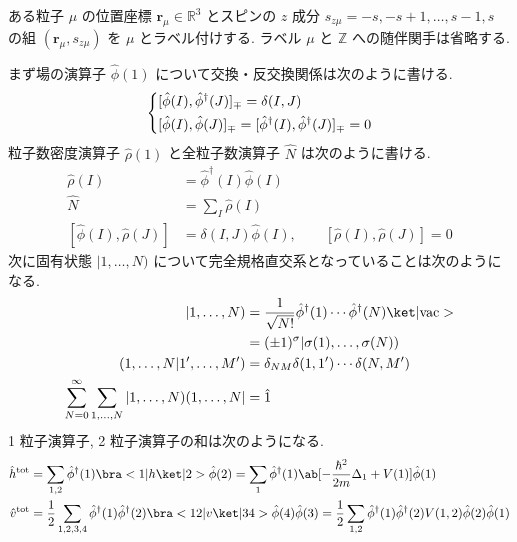 \documentclass[uplatex,dvipdfmx,a4paper,11pt]{jlreq}
\newcommand{\RR}{\mathbb{R}}
\newcommand{\ZZ}{\mathbb{Z}}
\newcommand{\rr}{\bm{r}}
\numberwithin{equation}{section}
\theoremstyle{definition}
\begin{document}
\begin{definition}[省略記法]
  ある粒子 $\mu$ の位置座標 $\rr_\mu\in\RR^3$ とスピンの $z$ 成分 $s_{z\mu} = -s,-s+1,\ldots,s-1,s$ の組 $(\rr_\mu, s_{z\mu})$ を $\mu$ とラベル付けする. ラベル $\mu$ と $\ZZ$ への随伴関手は省略する.
\end{definition}
\begin{example}[省略記法の例]
  まず場の演算子 $\hat{\phi}(1)$ について交換・反交換関係は次のように書ける.
  \begin{align}
    \begin{dcases}
      [\hat{\phi}(I), \hat{\phi}^\dagger(J)]_\mp = \delta(I, J) \\
      [\hat{\phi}(I), \hat{\phi}(J)]_\mp = [\hat{\phi}^\dagger(I), \hat{\phi}^\dagger(J)]_\mp = 0
    \end{dcases}
  \end{align}
  粒子数密度演算子 $\hat{\rho}(1)$ と全粒子数演算子 $\hat{N}$ は次のように書ける.
  \begin{align}
    \hat{\rho}(I)                  & = \hat{\phi}^\dagger(I)\hat{\phi}(I)                                   \\
    \hat{N}                        & = \sum_I\hat{\rho}(I)                                                  \\
    [\hat{\phi}(I), \hat{\rho}(J)] & = \delta(I, J)\hat{\phi}(I), \qquad [\hat{\rho}(I), \hat{\rho}(J)] = 0
  \end{align}
  次に固有状態 $|1,\ldots,N)$ について完全規格直交系となっていることは次のようになる.
  \begin{align}
    |1,\ldots,N)                                                   & = \frac{1}{\sqrt{N!}}\hat{\phi}^\dagger(1)\cdots\hat{\phi}^\dagger(N)\ket|\mathrm{vac}> \\
                                                                   & = (\pm 1)^\sigma|\sigma(1),\ldots,\sigma(N))                                            \\
    (1,\ldots,N|1',\ldots,M')                                      & = \delta_{NM}\delta(1, 1')\cdots\delta(N, M')                                           \\
    \sum_{N = 0}^{\infty}\sum_{1,\ldots,N}|1,\ldots,N)(1,\ldots,N| & = \hat{1}
  \end{align}
  1 粒子演算子, 2 粒子演算子の和は次のようになる.
  \begin{align}
    \hat{h}^{\mathrm{tot}} & = \sum_{1,2}\hat{\phi}^\dagger(1)\bra<1|h\ket|2>\hat{\phi}(2) = \sum_{1}\hat{\phi}^\dagger(1)\ab[-\frac{\hbar^2}{2m}\Delta_{1} + V(1)]\hat{\phi}(1)                                                                 \\
    \hat{v}^{\mathrm{tot}} & = \frac{1}{2}\sum_{1,2,3,4}\hat{\phi}^\dagger(1)\hat{\phi}^\dagger(2)\bra<12|v\ket|34>\hat{\phi}(4)\hat{\phi}(3) = \frac{1}{2}\sum_{1,2}\hat{\phi}^\dagger(1)\hat{\phi}^\dagger(2)V(1, 2)\hat{\phi}(2)\hat{\phi}(1)
  \end{align}
\end{example}
\end{document}

